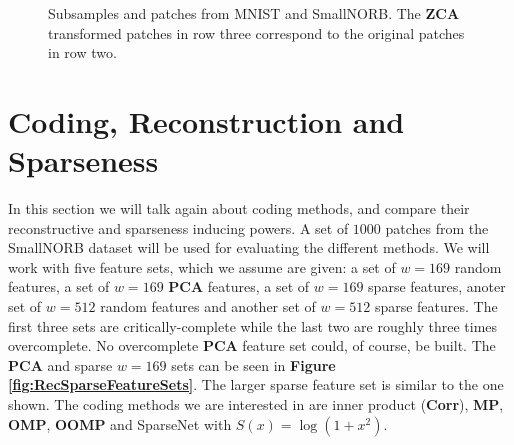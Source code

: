 \documentclass[12pt,a4paper,oneside,english]{UPBThesis}
\begin{document}
\begin{figure}
{  \label{fig:NORBSmallPatches}
}
\caption{Subsamples and patches from MNIST and SmallNORB. The \textbf{ZCA} transformed patches in row three correspond to the original patches in row two.}
\label{fig:ViewsOfMNISTAndNORBSmall}
\end{figure}

\clearpage

\section{Coding, Reconstruction and Sparseness}

In this section we will talk again about coding methods, and compare their reconstructive and sparseness inducing powers. A set of $1000$ patches from the SmallNORB dataset will be used for evaluating the different methods. We will work with five feature sets, which we assume are given: a set of $w=169$ random features, a set of $w=169$ \textbf{PCA} features, a set of $w=169$ sparse features, anoter set of $w=512$ random features and another set of $w=512$ sparse features. The first three sets are critically-complete while the last two are roughly three times overcomplete. No overcomplete \textbf{PCA} feature set could, of course, be built. The \textbf{PCA} and sparse $w=169$ sets can be seen in \textbf{Figure \ref{fig:RecSparseFeatureSets}}. The larger sparse feature set is similar to the one shown. The coding methods we are interested in are inner product (\textbf{Corr}), \textbf{MP}, \textbf{OMP}, \textbf{OOMP} and SparseNet with $S(x) = \log(1 + x^2)$.
\end{document}
